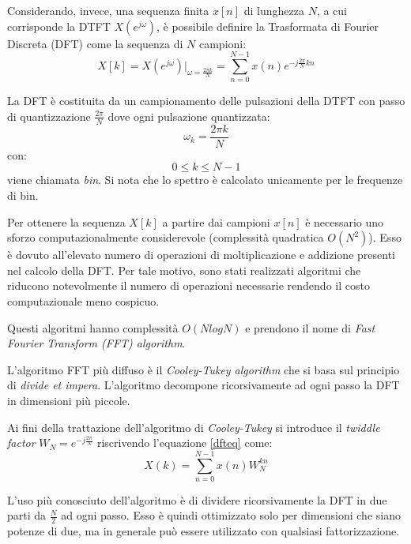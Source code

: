 Considerando, invece, una sequenza finita $x[n]$ di lunghezza $N$, a cui corrisponde la DTFT $X(e^{j\omega})$, è possibile definire la Trasformata di Fourier Discreta (DFT) come la sequenza di $N$ campioni:
\begin{equation}
	X[k]=X(e^{j\omega}) |_{\omega = \frac{2 \pi k}{N}} = \sum_{n=0}^{N-1} x(n)e^{-j \frac{2 \pi}{N} k n}
	\label{dfteq}
\end{equation}

La DFT è costituita da un campionamento delle pulsazioni della DTFT con passo di quantizzazione $\frac{2 \pi}{N}$ dove ogni pulsazione quantizzata:
\begin{equation}
	\omega _k = \frac{2 \pi k}{N} 
\end{equation}
con:
$$0 \leq k \leq N-1$$
viene chiamata \textit{bin}. Si nota che lo spettro è calcolato unicamente per le frequenze di bin.

Per ottenere la sequenza $X[k]$ a partire dai campioni $x[n]$ è necessario uno sforzo computazionalmente considerevole (complessità quadratica $O(N^2)$). Esso è dovuto all'elevato numero di operazioni di moltiplicazione e addizione presenti nel calcolo della DFT. Per tale motivo, sono stati realizzati algoritmi che riducono notevolmente il numero di operazioni necessarie rendendo il costo computazionale meno cospicuo.

Questi algoritmi hanno complessità $O(NlogN)$ e prendono il nome di 
\textit{Fast Fourier Transform (FFT) algorithm}.

L'algoritmo FFT più diffuso è il \textit{Cooley-Tukey algorithm} che si basa sul principio di \textit{divide et impera}. L'algoritmo decompone ricorsivamente ad ogni passo la DFT in dimensioni più piccole.

Ai fini della trattazione dell'algoritmo di \textit{Cooley-Tukey} si introduce il \textit{twiddle factor} $W_N = e^{-j \frac{2 \pi}{N}}$ riscrivendo l'equazione \ref{dfteq} come:
\begin{equation}
	X(k)=\sum_{n=0}^{N-1} x(n)W_N^{kn} 
	\label{dfteq2}
\end{equation}

L'uso più conosciuto dell'algoritmo è di dividere ricorsivamente la DFT in due parti da $\frac{N}{2}$ ad ogni passo. Esso è quindi ottimizzato solo per dimensioni che siano potenze di due, ma in generale può essere utilizzato con qualsiasi fattorizzazione.

